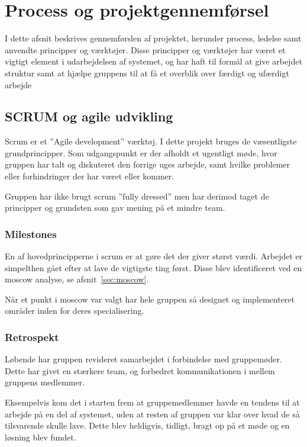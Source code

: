 \chapter{Process og projektgennemførsel}

I dette afsnit beskrives gennemførslen af projektet, herunder process, ledelse samt anvendte principper og værktøjer. Disse principper og værktøjer har været et vigtigt element i udarbejdelsen af systemet, og har haft til formål at give arbejdet struktur samt at hjælpe gruppens til at få et overblik over færdigt og ufærdigt arbejde

\section{SCRUM og agile udvikling}
Scrum er et ”Agile development” værktøj. I dette projekt bruges de væsentligste grundprincipper. Som udgangspunkt er der afholdt et ugentligt møde, hvor gruppen har talt og diskuteret den forrige uges arbejde, samt hvilke problemer eller forhindringer der har været eller kommer.

Gruppen har ikke brugt scrum ''fully dressed'' men har derimod taget de principper og grundsten som gav mening på et mindre team.

\subsection{Milestones}
En af hovedprincipperne i scrum er at gøre det der giver størst værdi. Arbejdet er simpelthen gået efter at lave de vigtigste ting først. Disse blev identificeret ved en \gls{moscow} analyse, se afsnit~\ref{sec:moscow}.

Når et punkt i \gls{moscow} var valgt har hele gruppen så designet og implementeret områder inden for deres specialisering.

\subsection{Retrospekt}
Løbende har gruppen revideret samarbejdet i forbindelse med gruppemøder. Dette har givet en stærkere team, og forbedret kommunikationen i mellem gruppens medlemmer.

Eksempelvis kom det i starten frem at gruppemedlemmer havde en tendens til at arbejde på en del af systemet, uden at resten af gruppen var klar over hvad de så tilsvarende skulle lave. 
Dette blev heldigvis, tidligt, bragt op på et møde og en løsning blev fundet.

